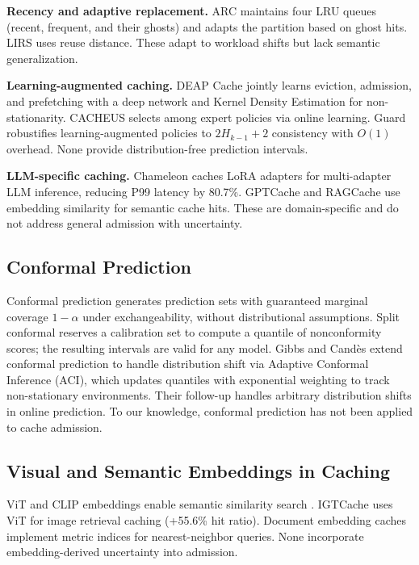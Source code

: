 \documentclass[11pt,letterpaper]{article}
\begin{document}
\textbf{Recency and adaptive replacement.} ARC \citep{Megiddo2003} maintains four LRU queues (recent, frequent, and their ghosts) and adapts the partition based on ghost hits. LIRS uses reuse distance. These adapt to workload shifts but lack semantic generalization.

\textbf{Learning-augmented caching.} DEAP Cache \citep{Mangal2020} jointly learns eviction, admission, and prefetching with a deep network and Kernel Density Estimation for non-stationarity. CACHEUS selects among expert policies via online learning. Guard \citep{Chen2025} robustifies learning-augmented policies to $2H_{k-1}+2$ consistency with $O(1)$ overhead. None provide distribution-free prediction intervals.

\textbf{LLM-specific caching.} Chameleon \citep{Iliakopoulou2024} caches LoRA adapters for multi-adapter LLM inference, reducing P99 latency by 80.7\%. GPTCache and RAGCache use embedding similarity for semantic cache hits. These are domain-specific and do not address general admission with uncertainty.

\subsection{Conformal Prediction}

Conformal prediction \citep{Angelopoulos2021} generates prediction sets with guaranteed marginal coverage $1-\alpha$ under exchangeability, without distributional assumptions. Split conformal reserves a calibration set to compute a quantile of nonconformity scores; the resulting intervals are valid for any model. Gibbs and Cand\`es \citep{Gibbs2021} extend conformal prediction to handle distribution shift via Adaptive Conformal Inference (ACI), which updates quantiles with exponential weighting to track non-stationary environments. Their follow-up \citep{Gibbs2022} handles arbitrary distribution shifts in online prediction. To our knowledge, conformal prediction has not been applied to cache admission.

\subsection{Visual and Semantic Embeddings in Caching}

ViT and CLIP embeddings enable semantic similarity search \citep{Dosovitskiy2021}. IGTCache uses ViT for image retrieval caching (+55.6\% hit ratio). Document embedding caches implement metric indices for nearest-neighbor queries. None incorporate embedding-derived uncertainty into admission.
\end{document}
